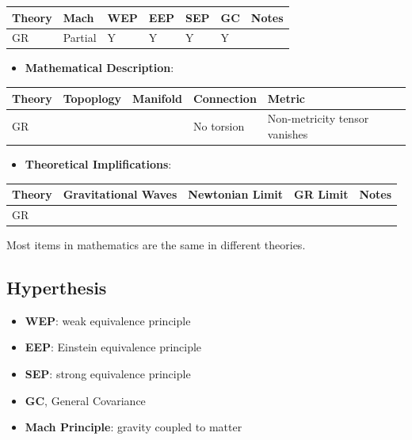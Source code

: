 \documentclass[letterpaper,10pt,english]{sphinxmanual}
\begin{document}
\begin{tabulary}{\linewidth}{|L|L|L|L|L|L|L|}
\hline
\textsf{\relax 
Theory
} & \textsf{\relax 
Mach
} & \textsf{\relax 
WEP
} & \textsf{\relax 
EEP
} & \textsf{\relax 
SEP
} & \textsf{\relax 
GC
} & \textsf{\relax 
Notes
}\\
\hline
GR
 & 
Partial
 & 
Y
 & 
Y
 & 
Y
 & 
Y
 & \\
\hline\end{tabulary}

\begin{itemize}
\item {} 
\textbf{Mathematical Description}:

\end{itemize}

\begin{tabulary}{\linewidth}{|L|L|L|L|L|}
\hline
\textsf{\relax 
Theory
} & \textsf{\relax 
Topoplogy
} & \textsf{\relax 
Manifold
} & \textsf{\relax 
Connection
} & \textsf{\relax 
Metric
}\\
\hline
GR
 &  &  & 
No torsion
 & 
Non-metricity tensor vanishes
\\
\hline\end{tabulary}

\begin{itemize}
\item {} 
\textbf{Theoretical Implifications}:

\end{itemize}

\begin{tabulary}{\linewidth}{|L|L|L|L|L|}
\hline
\textsf{\relax 
Theory
} & \textsf{\relax 
Gravitational Waves
} & \textsf{\relax 
Newtonian Limit
} & \textsf{\relax 
GR Limit
} & \textsf{\relax 
Notes
}\\
\hline
GR
 &  &  &  & \\
\hline\end{tabulary}


Most items in mathematics are the same in different theories.


\subsection{Hyperthesis}
\label{relativity/GeneralRelativityAdv:hyperthesis}\begin{itemize}
\item {} 
\textbf{WEP}: weak equivalence principle

\item {} 
\textbf{EEP}: Einstein equivalence principle

\item {} 
\textbf{SEP}: strong equivalence principle

\item {} 
\textbf{GC}, General Covariance

\item {} 
\textbf{Mach Principle}: gravity coupled to matter

\end{itemize}
\end{document}
